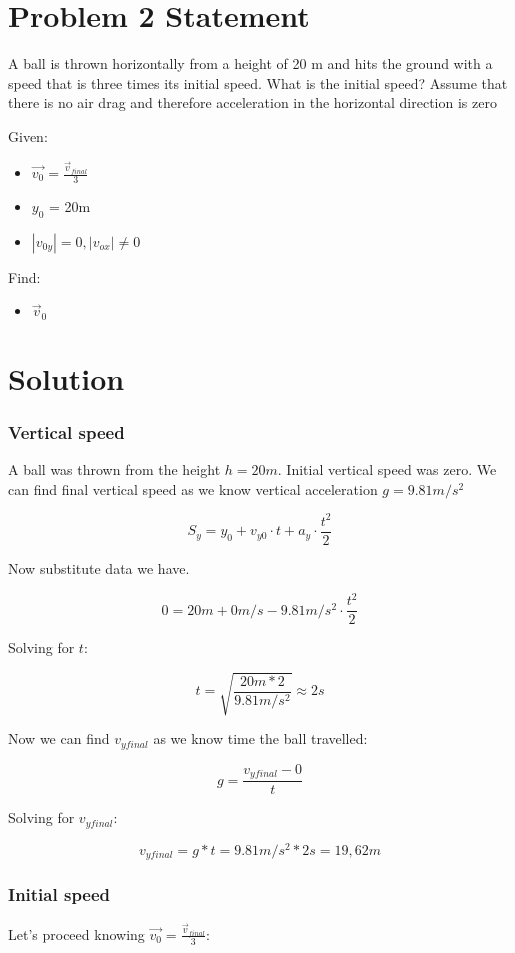 \section*{Problem 2 Statement}

A ball is thrown horizontally from a height of 20 m and hits the ground with a speed that is three
times its initial speed. What is the initial speed? Assume that there is no air drag and therefore
acceleration in the horizontal direction is zero 

\bigbreak Given:
\begin{itemize}
    \item $\vec{v_0} = \frac{\vec{v}_{final}}{3}$
    \item $y_0$ = 20m
    \item $|v_{0y}| = 0, |v_{ox}| \neq 0$
\end{itemize}

Find:
\begin{itemize}
    \item $\vec{v}_{0}$
\end{itemize}

\section*{Solution}
\subsubsection*{Vertical speed}

A ball was thrown from the height $h = 20m$. Initial vertical speed was zero.
We can find final vertical speed as we know vertical acceleration $g = 9.81m/s^2$

$$ S_y = y_0 + v_{y0} \cdot t + a_y \cdot \frac{t^2}{2}$$

Now substitute data we have.

$$ 0 = 20m + 0m/s - 9.81m/s^2 \cdot \frac{t^2}{2}$$

Solving for $t$:

$$t = \sqrt{\frac{20m * 2}{9.81m/s^2}} \approx 2s$$

Now we can find $v_{yfinal}$ as we know time the ball travelled:

$$ g = \frac{v_{yfinal} - 0}{t}$$

Solving for $v_{yfinal}$:

$$v_{yfinal} = g * t = 9.81m/s^2 * 2s = 19,62m$$

\subsubsection*{Initial speed}
Let's proceed knowing $\vec{v_0} = \frac{\vec{v}_{final}}{3}$:

